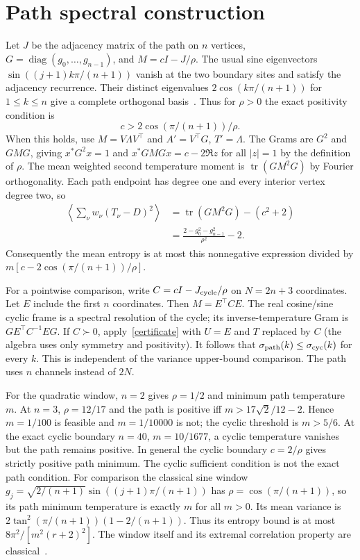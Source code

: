 \documentclass[11pt]{article}
\newcommand{\avg}[1]{\left\langle #1\right\rangle}
\begin{document}
\section{Path spectral construction}
Let $J$ be the adjacency matrix of the path on $n$ vertices, $G=\operatorname{diag}(g_0,\ldots,g_{n-1})$, and $M=cI-J/\rho$. The usual sine eigenvectors $\sin((j+1)k\pi/(n+1))$ vanish at the two boundary sites and satisfy the adjacency recurrence. Their distinct eigenvalues $2\cos(k\pi/(n+1))$ for $1\le k\le n$ give a complete orthogonal basis~\cite{brouwer}. Thus for $\rho>0$ the exact positivity condition is
\begin{equation}\label{pathpos}
c>2\cos(\pi/(n+1))/\rho.
\end{equation}
When this holds, use $M=V\Lambda V^\top$ and $A'=V^\top G$, $T'=\Lambda$. The Grams are $G^2$ and $GMG$, giving $x^*G^2x=1$ and $x^*GMGx=c-2\Re z$ for all $|z|=1$ by the definition of $\rho$. The mean weighted second temperature moment is $\operatorname{tr}(GM^2G)$ by Fourier orthogonality. Each path endpoint has degree one and every interior vertex degree two, so
\begin{align}
\avg{\sum_\nu w_\nu(T_\nu-D)^2}
&=\operatorname{tr}(GM^2G)-(c^2+2)\\
&=\frac{2-g_0^2-g_{n-1}^2}{\rho^2}-2.
\end{align}
Consequently the mean entropy is at most this nonnegative expression divided by $m[c-2\cos(\pi/(n+1))/\rho]$.

For a pointwise comparison, write $C=cI-J_{\rm cycle}/\rho$ on $N=2n+3$ coordinates. Let $E$ include the first $n$ coordinates. Then $M=E^\top CE$. The real cosine/sine cyclic frame is a spectral resolution of the cycle; its inverse-temperature Gram is $GE^\top C^{-1}EG$. If $C\succ0$, apply~\eqref{certificate} with $U=E$ and $T$ replaced by $C$ (the algebra uses only symmetry and positivity). It follows that $\sigma_{\rm path}(k)\le\sigma_{\rm cyc}(k)$ for every $k$. This is independent of the variance upper-bound comparison. The path uses $n$ channels instead of $2N$.

For the quadratic window, $n=2$ gives $\rho=1/2$ and minimum path temperature $m$. At $n=3$, $\rho=12/17$ and the path is positive iff $m>17\sqrt2/12-2$. Hence $m=1/100$ is feasible and $m=1/10000$ is not; the cyclic threshold is $m>5/6$. At the exact cyclic boundary $n=40$, $m=10/1677$, a cyclic temperature vanishes but the path remains positive. In general the cyclic boundary $c=2/\rho$ gives strictly positive path minimum. The cyclic sufficient condition is not the exact path condition.
For comparison the classical sine window $g_j=\sqrt{2/(n+1)}\sin((j+1)\pi/(n+1))$ has $\rho=\cos(\pi/(n+1))$, so its path minimum temperature is exactly $m$ for all $m>0$. Its mean variance is $2\tan^2(\pi/(n+1))(1-2/(n+1))$. Thus its entropy bound is at most $8\pi^2/[m^2(r+2)^2]$. The window itself and its extremal correlation property are classical~\cite{okayasu}.
\end{document}
